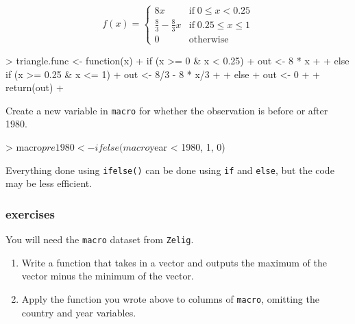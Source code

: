 \documentclass[handout]{beamer}
\newcommand{\red}{\color{red}}
\newcommand{\black}{\color{black}}
\begin{document}
\begin{frame}[fragile]
$$
f(x) = \left\lbrace \begin{array}{ll} 8x & \mathrm{if} \;
0 \le x < 0.25 \\
\frac{8}{3} - \frac{8}{3} x & \mathrm{if} \; 0.25 \le x \le 1 \\
0 & \mathrm{otherwise} \end{array} \right. 
$$
\bigskip
\pause
\red
\footnotesize
\begin{Schunk}
\begin{Sinput}
> triangle.func <- function(x) {
+     if (x >= 0 & x < 0.25) {
+         out <- 8 * x
+     }
+     else if (x >= 0.25 & x <= 1) {
+         out <- 8/3 - 8 * x/3
+     }
+     else {
+         out <- 0
+     }
+     return(out)
+ }
\end{Sinput}
\end{Schunk}
\end{frame}

\begin{frame}[fragile]
Create a new variable in {\tt macro} for whether the observation is before or after 1980.
\bigskip
\pause
\red
\footnotesize
\begin{Schunk}
\begin{Sinput}
> macro$pre1980 <- ifelse(macro$year < 1980, 1, 0)
\end{Sinput}
\end{Schunk}
\bigskip
\pause
\black
\normalsize
Everything done using {\tt \red ifelse()} can be done using {\tt \red if} and {\tt \red else}, but the code may be less efficient.
\end{frame}

\begin{frame}[fragile]
\frametitle{exercises}
You will need the {\tt macro} dataset from {\tt Zelig}.
\bigskip
\begin{enumerate}
\item Write a function that takes in a vector and outputs the maximum of the vector minus the minimum of the vector.
\item Apply the function you wrote above to columns of {\tt macro}, omitting the country and year variables.
\end{enumerate}
\end{frame}
\end{document}
